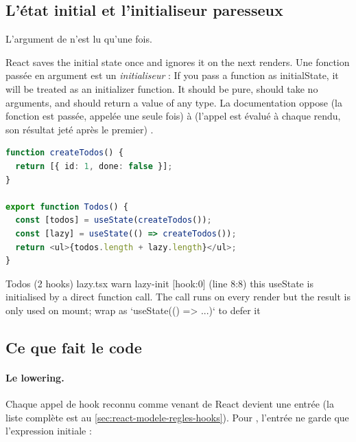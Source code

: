 \subsection{L'état initial et l'initialiseur paresseux}

L'argument de  n'est lu qu'une fois.

\begin{react}
\og React saves the initial state once and ignores it on the next
renders.\fg{} Une fonction passée en argument est un \emph{initialiseur} :
\og If you pass a function as initialState, it will be treated as an
initializer function. It should be pure, should take no arguments, and should
return a value of any type.\fg{} La documentation oppose
 (la fonction est passée, appelée une seule
fois) à  (l'appel est évalué à chaque
rendu, son résultat jeté après le premier) \cite{ReactDocs}.
\end{react}

\begin{lstlisting}[language=TypeScript,caption={\code{Todos} : initialiseur appelé à chaque rendu, et sa forme paresseuse (\file{/tmp/ch02/lazy.tsx}, imports omis)},label={lst:react-modele-lazy}]
function createTodos() {
  return [{ id: 1, done: false }];
}

export function Todos() {
  const [todos] = useState(createTodos());
  const [lazy] = useState(() => createTodos());
  return <ul>{todos.length + lazy.length}</ul>;
}
\end{lstlisting}

\begin{sortie}
  Todos  (2 hooks)  lazy.tsx
    warn   lazy-init  [hook:0]  (line 8:8)  this useState is initialised by a direct function call. The call runs on every render but the result is only used on mount; wrap as `useState(() => ...)` to defer it
\end{sortie}

\subsection{Ce que fait le code}

\paragraph{Le lowering.} Chaque appel de hook reconnu comme venant de React
devient une entrée  (la liste complète est au
\cref{sec:react-modele-regles-hooks}). Pour , l'entrée ne garde
que l'expression initiale :


